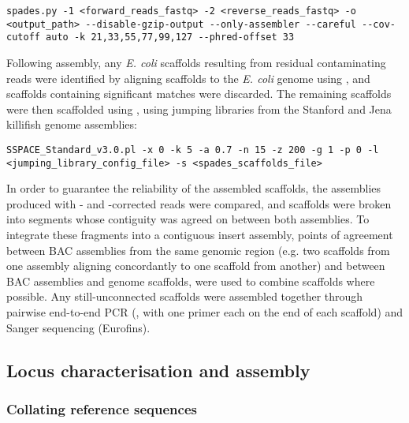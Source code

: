 \begin{lstlisting}
spades.py -1 <forward_reads_fastq> -2 <reverse_reads_fastq> -o <output_path> --disable-gzip-output --only-assembler --careful --cov-cutoff auto -k 21,33,55,77,99,127 --phred-offset 33
\end{lstlisting}

Following assembly, any \textit{E. coli} scaffolds resulting from residual contaminating reads were identified by aligning scaffolds to the \textit{E. coli} genome using  \parencite{altschul1990blast,altschul1997blast}, and scaffolds containing significant matches were discarded. The remaining scaffolds were then scaffolded using  \parencite{boetzer2011sspace}, using jumping libraries from the Stanford \parencite{valenzano2015genome} and Jena \parencite{reichwald2015genome} killifish genome assemblies: %

\begin{lstlisting}
SSPACE_Standard_v3.0.pl -x 0 -k 5 -a 0.7 -n 15 -z 200 -g 1 -p 0 -l <jumping_library_config_file> -s <spades_scaffolds_file>
\end{lstlisting}

In order to guarantee the reliability of the assembled scaffolds, the assemblies produced with - and -corrected reads were compared, and scaffolds were broken into segments whose contiguity was agreed on between both assemblies. To integrate these fragments into a contiguous insert assembly, points of agreement between BAC assemblies from the same genomic region (e.g. two scaffolds from one assembly aligning concordantly to one scaffold from another) and between BAC assemblies and genome scaffolds, were used to combine scaffolds where possible. Any still-unconnected scaffolds were assembled together through pairwise end-to-end PCR (, with one primer each on the end of each scaffold) and Sanger sequencing (Eurofins).

\subsection{Locus characterisation and assembly}
\label{sec:methods_comp_locus}

\subsubsection{Collating reference sequences}
\label{sec:methods_comp_locus_reference}

